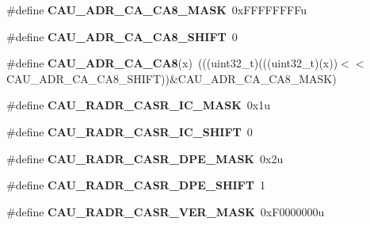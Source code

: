 \begin{DoxyCompactItemize}
\item 
\#define {\bfseries C\+A\+U\+\_\+\+A\+D\+R\+\_\+\+C\+A\+\_\+\+C\+A8\+\_\+\+M\+A\+SK}~0x\+F\+F\+F\+F\+F\+F\+F\+Fu\hypertarget{group__CAU__Register__Masks_ga588ce6c296b5bc630763b325bca7e346}{}\label{group__CAU__Register__Masks_ga588ce6c296b5bc630763b325bca7e346}

\item 
\#define {\bfseries C\+A\+U\+\_\+\+A\+D\+R\+\_\+\+C\+A\+\_\+\+C\+A8\+\_\+\+S\+H\+I\+FT}~0\hypertarget{group__CAU__Register__Masks_ga4438c1d48ac4e4e715fdd705f409e0fc}{}\label{group__CAU__Register__Masks_ga4438c1d48ac4e4e715fdd705f409e0fc}

\item 
\#define {\bfseries C\+A\+U\+\_\+\+A\+D\+R\+\_\+\+C\+A\+\_\+\+C\+A8}(x)~(((uint32\+\_\+t)(((uint32\+\_\+t)(x))$<$$<$C\+A\+U\+\_\+\+A\+D\+R\+\_\+\+C\+A\+\_\+\+C\+A8\+\_\+\+S\+H\+I\+FT))\&C\+A\+U\+\_\+\+A\+D\+R\+\_\+\+C\+A\+\_\+\+C\+A8\+\_\+\+M\+A\+SK)\hypertarget{group__CAU__Register__Masks_gad97c6437bc1de70a75242ffd964b973f}{}\label{group__CAU__Register__Masks_gad97c6437bc1de70a75242ffd964b973f}

\item 
\#define {\bfseries C\+A\+U\+\_\+\+R\+A\+D\+R\+\_\+\+C\+A\+S\+R\+\_\+\+I\+C\+\_\+\+M\+A\+SK}~0x1u\hypertarget{group__CAU__Register__Masks_ga8b83182cdf0c23dd0359bdd4bde2e770}{}\label{group__CAU__Register__Masks_ga8b83182cdf0c23dd0359bdd4bde2e770}

\item 
\#define {\bfseries C\+A\+U\+\_\+\+R\+A\+D\+R\+\_\+\+C\+A\+S\+R\+\_\+\+I\+C\+\_\+\+S\+H\+I\+FT}~0\hypertarget{group__CAU__Register__Masks_gaaaed76b153aa3db1dd33853bd41f890f}{}\label{group__CAU__Register__Masks_gaaaed76b153aa3db1dd33853bd41f890f}

\item 
\#define {\bfseries C\+A\+U\+\_\+\+R\+A\+D\+R\+\_\+\+C\+A\+S\+R\+\_\+\+D\+P\+E\+\_\+\+M\+A\+SK}~0x2u\hypertarget{group__CAU__Register__Masks_gae77a40261939bae263003192796104ac}{}\label{group__CAU__Register__Masks_gae77a40261939bae263003192796104ac}

\item 
\#define {\bfseries C\+A\+U\+\_\+\+R\+A\+D\+R\+\_\+\+C\+A\+S\+R\+\_\+\+D\+P\+E\+\_\+\+S\+H\+I\+FT}~1\hypertarget{group__CAU__Register__Masks_ga29f9fdde7f5d91e78a00e02dc66d90ce}{}\label{group__CAU__Register__Masks_ga29f9fdde7f5d91e78a00e02dc66d90ce}

\item 
\#define {\bfseries C\+A\+U\+\_\+\+R\+A\+D\+R\+\_\+\+C\+A\+S\+R\+\_\+\+V\+E\+R\+\_\+\+M\+A\+SK}~0x\+F0000000u\hypertarget{group__CAU__Register__Masks_ga93d73e487a9f7e0f78ff89b8c2162099}{}\label{group__CAU__Register__Masks_ga93d73e487a9f7e0f78ff89b8c2162099}


\end{DoxyCompactItemize}
